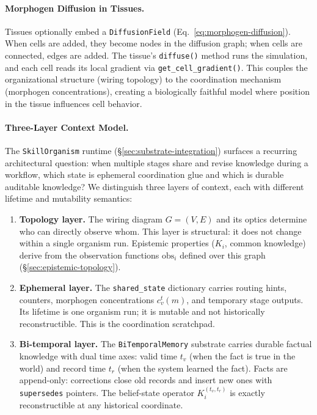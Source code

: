 \paragraph{Morphogen Diffusion in Tissues.}
Tissues optionally embed a \texttt{DiffusionField} (Eq.~\eqref{eq:morphogen-diffusion}). When cells are added, they become nodes in the diffusion graph; when cells are connected, edges are added. The tissue's \texttt{diffuse()} method runs the simulation, and each cell reads its local gradient via \texttt{get\_cell\_gradient()}. This couples the organizational structure (wiring topology) to the coordination mechanism (morphogen concentrations), creating a biologically faithful model where position in the tissue influences cell behavior.

\paragraph{Three-Layer Context Model.}
\label{par:three-layer-context}
The \texttt{SkillOrganism} runtime (\S\ref{sec:substrate-integration}) surfaces a recurring architectural question: when multiple stages share and revise knowledge during a workflow, which state is ephemeral coordination glue and which is durable auditable knowledge? We distinguish three layers of context, each with different lifetime and mutability semantics:

\begin{enumerate}[leftmargin=*]
\item \textbf{Topology layer.}
The wiring diagram $G = (V, E)$ and its optics determine who can directly observe whom. This layer is structural: it does not change within a single organism run. Epistemic properties ($K_i$, common knowledge) derive from the observation functions $\mathrm{obs}_i$ defined over this graph (\S\ref{sec:epistemic-topology}).

\item \textbf{Ephemeral layer.}
The \texttt{shared\_state} dictionary carries routing hints, counters, morphogen concentrations $c_v^t(m)$, and temporary stage outputs. Its lifetime is one organism run; it is mutable and not historically reconstructible. This is the coordination scratchpad.

\item \textbf{Bi-temporal layer.}
The \texttt{BiTemporalMemory} substrate carries durable factual knowledge with dual time axes: valid time $t_v$ (when the fact is true in the world) and record time $t_r$ (when the system learned the fact). Facts are append-only: corrections close old records and insert new ones with \texttt{supersedes} pointers. The belief-state operator $K_i^{(t_v, t_r)}$ is exactly reconstructible at any historical coordinate.
\end{enumerate}

